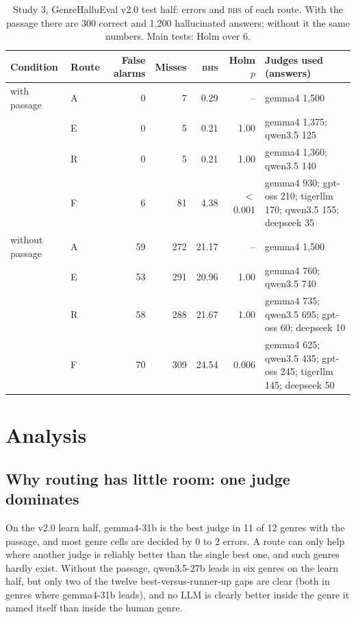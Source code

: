 \documentclass[11pt]{article}
\newcommand{\BHS}{\textsc{bhs}}
\begin{document}
\begin{table}[t]
\centering\small
\caption{Study 3, GenreHalluEval v2.0 test half: errors and \BHS{} of each route. With the passage there are 300
correct and 1,200 hallucinated answers; without it the same numbers. Main tests: Holm over 6.}\label{tab:v2}
\begin{tabularx}{\textwidth}{@{}llrrrr>{\raggedright\arraybackslash}X@{}}
\toprule
Condition & Route & False alarms & Misses & \BHS{} & Holm $p$ & Judges used (answers) \\
\midrule
with passage & A & 0 & 7 & 0.29 & -- & gemma4 1,500 \\
 & E & 0 & 5 & 0.21 & 1.00 & gemma4 1,375; qwen3.5 125 \\
 & R & 0 & 5 & 0.21 & 1.00 & gemma4 1,360; qwen3.5 140 \\
 & F & 6 & 81 & 4.38 & $<$0.001 & gemma4 930; gpt-oss 210; tigerllm 170; qwen3.5 155; deepseek 35 \\
\midrule
without passage & A & 59 & 272 & 21.17 & -- & gemma4 1,500 \\
 & E & 53 & 291 & 20.96 & 1.00 & gemma4 760; qwen3.5 740 \\
 & R & 58 & 288 & 21.67 & 1.00 & gemma4 735; qwen3.5 695; gpt-oss 60; deepseek 10 \\
 & F & 70 & 309 & 24.54 & 0.006 & gemma4 625; qwen3.5 435; gpt-oss 245; tigerllm 145; deepseek 50 \\
\bottomrule
\end{tabularx}
\end{table}

\section{Analysis}

\subsection{Why routing has little room: one judge dominates}

On the v2.0 learn half, gemma4-31b is the best judge in 11 of 12 genres with the passage, and most genre cells are
decided by 0 to 2 errors. A route can only help where another judge is reliably better than the single best one, and
such genres hardly exist. Without the passage, qwen3.5-27b leads in six genres on the learn half, but only two of the
twelve best-versus-runner-up gaps are clear (both in genres where gemma4-31b leads), and no LLM is clearly better inside
the genre it named itself than inside the human genre.
\end{document}
